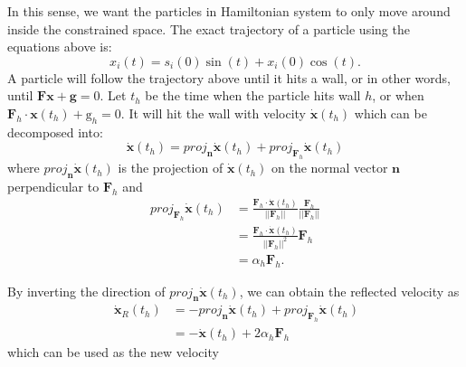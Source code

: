 \documentclass{scrartcl}
\numberwithin{equation}{section}
\begin{document}
In this sense, we want the particles in Hamiltonian system to only move around inside the constrained space. The exact trajectory of a particle using the equations above is:    
\begin{equation}\label{eq:path}
	x_i(t) = s_i(0)\sin(t) + x_i(0)\cos(t).
\end{equation}
A particle will follow the trajectory above until it hits a wall, or in other words, until $\textbf{F}\textbf{x} + \textbf{g} = 0$. Let $t_h$ be the time when the particle hits wall $h$, or when $\textbf{F}_h \cdot \textbf{x}(t_h) + \text{g}_h = 0$. It will hit the wall with velocity $\dot{\textbf{x}}(t_h)$ which can be decomposed into:   
\begin{equation}\label{eq:bounce}
	\dot{\textbf{x}}(t_h) = proj_{\textbf{n}}\dot{\textbf{x}}(t_h) + proj_{\textbf{F}_h}\dot{\textbf{x}}(t_h)
\end{equation}
where $proj_{\textbf{n}}\dot{\textbf{x}}(t_h)$ is the projection of $\dot{\textbf{x}}(t_h)$ on the normal vector $\textbf{n}$ perpendicular to $\textbf{F}_h$ and
\begin{equation}\label{eq:proj}
\begin{split}
	proj_{\textbf{F}_h}\dot{\textbf{x}}(t_h) &= \frac{\textbf{F}_h \cdot \dot{\textbf{x}}(t_h)}{||\textbf{F}_h||}\frac{\textbf{F}_h}{||\textbf{F}_h||}\\  
	&= \frac{\textbf{F}_h \cdot \dot{\textbf{x}}(t_h)}{||\textbf{F}_h||^2}\textbf{F}_h \\
	&= \alpha_h\textbf{F}_h.
\end{split}
\end{equation}

By inverting the direction of $proj_{\textbf{n}}\dot{\textbf{x}}(t_h)$, we can obtain the reflected velocity as
\begin{equation}\
\begin{split}
	\dot{\textbf{x}}_R(t_h) & = -proj_{\textbf{n}}\dot{\textbf{x}}(t_h) + proj_{\textbf{F}_h}\dot{\textbf{x}}(t_h) \\
	& = -\dot{\textbf{x}}(t_h) + 2\alpha_h\textbf{F}_h
\end{split}
\end{equation}
which can be used as the new velocity 



\end{document}
